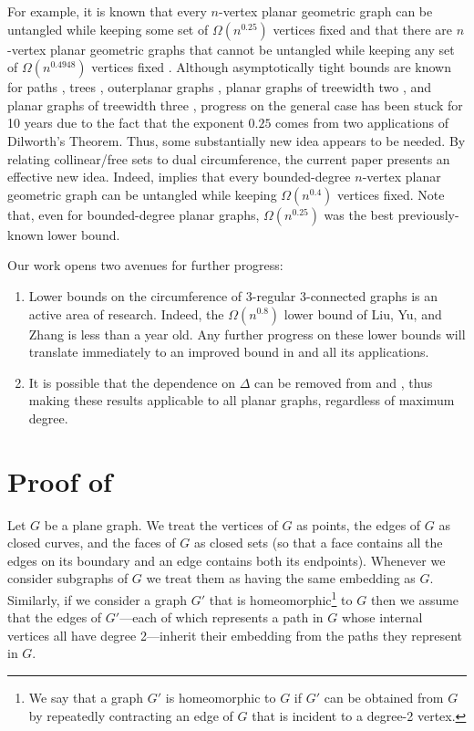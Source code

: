 \documentclass{patmorin}
\begin{document}
For example, it is known that every $n$-vertex planar geometric graph
can be untangled while keeping some set of $\Omega(n^{0.25})$ vertices
fixed \cite{bose.dujmovic.ea:polynomial} and that there are $n$-vertex
planar geometric graphs that cannot be untangled while keeping any set of
$\Omega(n^{0.4948})$ vertices fixed \cite{cano.toth.ea:upper}. Although
asymptotically tight bounds are known for paths \cite{cibulka:untangling},
trees \cite{goaoc.kratochvil.ea:untangling}, outerplanar graphs
\cite{goaoc.kratochvil.ea:untangling}, planar graphs of treewidth
two \cite{ravsky.verbitsky:on}, and planar graphs of treewidth three
\cite{dalozzo.dujmovic.ea:drawing}, progress on the general case has
been stuck for 10 years due to the fact that the exponent $0.25$ comes
from two applications of Dilworth's Theorem.  Thus, some substantially
new idea appears to be needed. By relating collinear/free sets to
dual circumference, the current paper presents an effective new idea.
Indeed,  implies that every bounded-degree $n$-vertex
planar geometric graph can be untangled while keeping $\Omega(n^{0.4})$
vertices fixed.  Note that, even for bounded-degree planar graphs,
$\Omega(n^{0.25})$ was the best previously-known lower bound.

Our work opens two avenues for further progress:

\begin{enumerate}
   \item Lower bounds on the circumference of 3-regular
      3-connected graphs is an active area of research. Indeed,
      the $\Omega(n^{0.8})$ lower bound of Liu, Yu, and Zhang
      \cite{liu.yu.zhang:circumference} is less than a year old.  Any
      further progress on these lower bounds will translate immediately
      to an improved bound in  and all its applications.

   \item It is possible that the dependence on $\Delta$ can be removed
      from  and , thus making these results
      applicable to all planar graphs, regardless of maximum degree.
\end{enumerate}

\section{Proof of }

Let $G$ be a plane graph.  We treat the vertices of $G$ as points,
the edges of $G$ as closed curves, and the faces of $G$ as closed sets
(so that a face contains all the edges on its boundary and an edge
contains both its endpoints).  Whenever we consider subgraphs of $G$
we treat them as having the same embedding as $G$.  Similarly, if we
consider a graph $G'$ that is homeomorphic\footnote{We say that a graph $G'$ is homeomorphic to $G$ if $G'$ can be obtained from $G$ by repeatedly contracting an edge of $G$ that is incident to a degree-2 vertex.} to $G$ then we assume
that the edges of $G'$---each of which represents a path in $G$
whose internal vertices all have degree 2---inherit their embedding from
the paths they represent in $G$.
\end{document}
